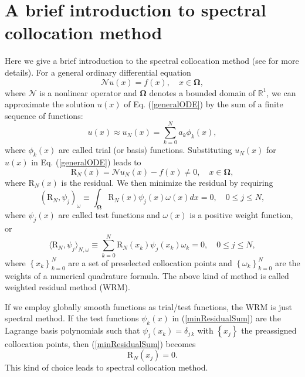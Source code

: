 \documentclass[11pt,a4paper,psfrag]{article}
\begin{document}
\section{A brief introduction to spectral collocation method}
Here we give a brief introduction to the spectral collocation method (see \cite{Shen:2011,Yin:2013} for more details). For a general ordinary differential equation
\begin{equation}\label{generalODE}
\mathcal{N}u(x)=f(x), \quad x \in \boldsymbol{\Omega},
\end{equation}
where $\mathcal{N}$ is a nonlinear operator and $\boldsymbol{\Omega}$ denotes a bounded domain of $\mathbb{R}^1$, we can approximate the solution $u(x)$ of Eq. (\ref{generalODE}) by the sum of a finite sequence of functions:
\begin{equation}\label{approxOfSol1}
u(x) \approx u_N (x) = \sum\limits_{k=0}^{N} a_k \phi_k (x),
\end{equation}
where $\phi_{k}(x)$ are called trial (or basis) functions. Substituting $u_N(x)$ for $u(x)$ in Eq. (\ref{generalODE}) leads to
\begin{equation}\label{residualOfODE}
\boldsymbol{\mathrm{R}}_N (x)=\mathcal{N} u_N(x)-f(x) \not= 0, \quad x \in \boldsymbol{\Omega},
\end{equation}
where $\boldsymbol{\mathrm{R}}_N (x)$ is the residual. We then minimize the residual by requiring
\begin{equation}\label{minResidualIntegral}
\left( \boldsymbol{\mathrm{R}}_N, \psi_j \right)_{\omega} \equiv \int_{\boldsymbol{\Omega}}^{} \boldsymbol{\mathrm{R}}_N (x) \psi_j(x) \omega(x) dx =0, \quad 0 \le j \le N,
\end{equation}
where $\psi_j(x)$ are called test functions and $\omega(x)$ is a positive weight function, or
\begin{equation}\label{minResidualSum}
\langle \boldsymbol{\mathrm{R}}_N, \psi_j \rangle_{N, \omega} \equiv \sum\limits_{k=0}^{N} \boldsymbol{\mathrm{R}}_N (x_k) \psi_j(x_k) \omega_k =0, \quad 0 \le j \le N,
\end{equation}
where $\left\{ x_k \right\}_{k=0}^{N}$ are a set of preselected collocation points and $\left\{ \omega_k \right\}_{k=0}^{N}$ are the weights of a numerical quadrature formula. The above kind of method is called weighted residual method (WRM).
\par
If we employ globally smooth functions as trial/test functions, the WRM is just spectral method. If the test functions $\psi_k (x)$ in (\ref{minResidualSum}) are the Lagrange basis polynomials such that $\psi_j (x_k)=\delta_{j\,k}$ with $\left\{ x_j \right\}$ the preassigned collocation points, then (\ref{minResidualSum}) becomes
\begin{equation}\label{residualInSpectCollocMethod}
\boldsymbol{\mathrm{R}}_N (x_j)=0.
\end{equation}
This kind of choice leads to spectral collocation method.
\end{document}
